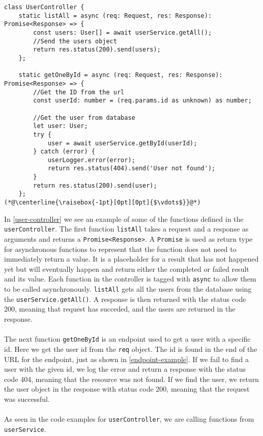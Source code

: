 \begin{lstlisting}[caption={Shows some of the endpoints from the UserController}, captionpos=b, label={user-controller}]
class UserController {
	static listAll = async (req: Request, res: Response): Promise<Response> => {
		const users: User[] = await userService.getAll();
		//Send the users object
		return res.status(200).send(users);
    };

    static getOneById = async (req: Request, res: Response): Promise<Response> => {
		//Get the ID from the url
		const userId: number = (req.params.id as unknown) as number;

		//Get the user from database
		let user: User;
		try {
			user = await userService.getById(userId);
		} catch (error) {
			userLogger.error(error);
			return res.status(404).send('User not found');
		}
		return res.status(200).send(user);
	};
(*@\centerline{\raisebox{-1pt}[0pt][0pt]{$\vdots$}}@*)
\end{lstlisting}
In \autoref{user-controller} we see an example of some of the functions defined in the \texttt{userController}.
The first function \texttt{listAll} takes a request and a response as arguments and returns a \texttt{Promise<Response>}.
A \texttt{Promise} is used as return type for asynchronous functions to represent that the function does not need to immediately return a value.
It is a placeholder for a result that has not happened yet but will eventually happen and return either the completed or failed result and its value.
Each function in the controller is tagged with \texttt{async} to allow them to be called asynchronously. 
\texttt{listAll} gets all the users from the database using the \texttt{userService.getAll()}.
A response is then returned with the status code 200, meaning that request has succeded, and the users are returned in the response. 
\\\\
The next function \texttt{getOneById} is an endpoint used to get a user with a specific id. 
Here we get the user id from the \texttt{req} object. 
The id is found in the end of the URL for the endpoint, just as shown in \autoref{endpoint-example}.
If we fail to find a user with the given id, we log the error and return a response with the status code 404, meaning that the resource was not found.
If we find the user, we return the user object in the response with status code 200, meaning that the request was successful.
\\\\
As seen in the code examples for \texttt{userController}, we are calling functions from \texttt{userService}. 
